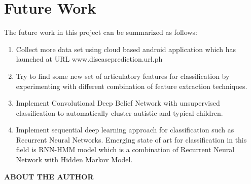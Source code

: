 \documentclass[11pt]{report}
\begin{document}
\section{Future Work}
The future work in this project can be summarized as follows:
\begin{enumerate}
\item Collect more data set using cloud based android application which has launched at URL www.diseaseprediction.url.ph
\item Try to find some new set of articulatory features for classification by experimenting with different combination of feature extraction techniques.

\item Implement Convolutional Deep Belief Network with unsupervised classification to automatically cluster autistic and typical children.
\item Implement sequential deep learning approach for classification such as Recurrent Neural Networks. Emerging state of art for classification in this field is RNN-HMM model which is a combination of Recurrent Neural Network with Hidden Markov Model.
\end{enumerate}






\newpage









\newpage

\begin{center}
\textbf{ABOUT THE AUTHOR}\\[.5cm]
 \end{center}
\end{document}
